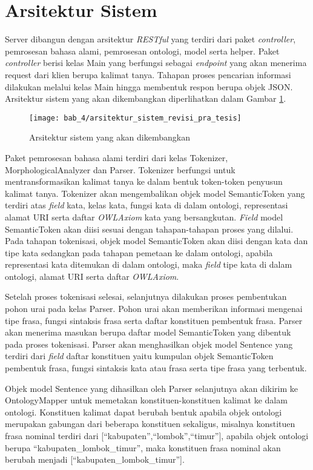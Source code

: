 \section{Arsitektur Sistem}
Server dibangun dengan arsitektur \emph{RESTful} yang terdiri dari paket \emph{controller}, pemrosesan bahasa alami, pemrosesan ontologi, model serta helper. Paket \emph{controller} berisi kelas Main yang berfungsi sebagai \emph{endpoint} yang akan menerima request dari klien berupa kalimat tanya. Tahapan proses pencarian informasi dilakukan melalui kelas Main hingga membentuk respon berupa objek JSON. Arsitektur sistem yang akan dikembangkan diperlihatkan dalam Gambar \ref{fig:arsitektur_sistem}.

\begin{figure}[ht]
    \centering
    \texttt{[image: bab\_4/arsitektur\_sistem\_revisi\_pra\_tesis]}
    \caption{Arsitektur sistem yang akan dikembangkan}
    \label{fig:arsitektur_sistem}
\end{figure}

Paket pemrosesan bahasa alami terdiri dari kelas Tokenizer, MorphologicalAnalyzer dan Parser. Tokenizer berfungsi untuk mentransformasikan kalimat tanya ke dalam bentuk token-token penyusun kalimat tanya. Tokenizer akan mengembalikan objek model SemanticToken yang terdiri atas \emph{field} kata, kelas kata, fungsi kata di dalam ontologi, representasi alamat URI serta daftar \emph{OWLAxiom} kata yang bersangkutan. \emph{Field} model SemanticToken akan diisi sesuai dengan tahapan-tahapan proses yang dilalui. Pada tahapan tokenisasi, objek model SemanticToken akan diisi dengan kata dan tipe kata sedangkan pada tahapan pemetaan ke dalam ontologi, apabila representasi kata ditemukan di dalam ontologi, maka \emph{field} tipe kata di dalam ontologi, alamat URI serta daftar \emph{OWLAxiom}.

Setelah proses tokenisasi selesai, selanjutnya dilakukan proses pembentukan pohon urai pada kelas Parser. Pohon urai akan memberikan informasi mengenai tipe frasa, fungsi sintaksis frasa serta daftar konstituen pembentuk frasa. Parser akan menerima masukan berupa daftar model SemanticToken yang dibentuk pada proses tokenisasi. Parser akan menghasilkan objek model Sentence yang terdiri dari \emph{field} daftar konstituen yaitu kumpulan objek SemanticToken pembentuk frasa, fungsi sintaksis kata atau frasa serta tipe frasa yang terbentuk.

Objek model Sentence yang dihasilkan oleh Parser selanjutnya akan dikirim ke OntologyMapper untuk memetakan konstituen-konstituen kalimat ke dalam ontologi. Konstituen kalimat dapat berubah bentuk apabila objek ontologi merupakan gabungan dari beberapa konstituen sekaligus, misalnya konstituen frasa nominal terdiri dari [``kabupaten'',``lombok'',``timur''], apabila objek ontologi berupa ``kabupaten\_lombok\_timur'', maka konstituen frasa nominal akan berubah menjadi [``kabupaten\_lombok\_timur''].

